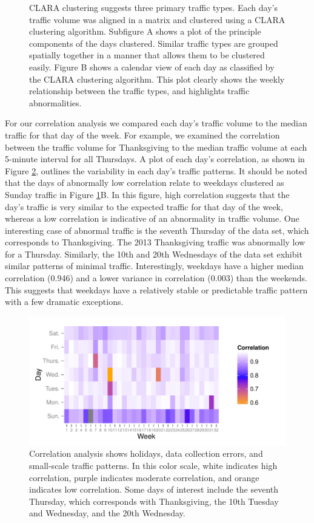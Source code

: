 \documentclass{report}
\begin{document}
\begin{figure}[H]
\begin{subfigure}[b]{0.45\textwidth}
\end{subfigure}
\caption{CLARA clustering suggests three primary traffic types. Each day's traffic volume
was aligned in a matrix and clustered using a CLARA clustering algorithm. Subfigure A shows a plot of the principle components of the days clustered. Similar traffic types are grouped spatially together in a manner that allows them to be clustered easily. Figure B shows a calendar view of each day as classified by the CLARA clustering algorithm. This plot clearly shows the weekly relationship between the traffic types, and highlights traffic abnormalities.}
\label{fig:clustering}
\end{figure}


For our correlation analysis we compared each day's traffic volume to the median
traffic for that day of the week. For example, we examined the correlation between
the traffic volume for Thanksgiving to the median traffic volume at each 5-minute
interval for all Thursdays. A plot of each day's correlation, as shown in Figure \ref{fig:correlation},
outlines the variability in each day's traffic patterns. It should be noted that
the days of abnormally low correlation relate to weekdays clustered as Sunday
traffic in Figure \ref{fig:clustering}B. In this figure, high correlation suggests that
the day's traffic is very similar to the expected traffic for that day of the week,
whereas a low correlation is indicative of an abnormality in traffic volume.
One interesting case of abnormal traffic is the seventh Thursday of the data set,
which corresponds to Thanksgiving. The 2013 Thanksgiving traffic was abnormally
low for a Thursday. Similarly, the 10th and 20th Wednesdays of the data set
exhibit similar patterns of minimal traffic. Interestingly, weekdays have a higher
median correlation (0.946) and a lower
variance in correlation (0.003) than the weekends. This
suggests that weekdays have a relatively stable or predictable traffic pattern
with a few dramatic exceptions.

\begin{figure}[h]
\centering
\includegraphics{upstat_report-008}
\caption{Correlation analysis shows holidays, data collection errors, and small-scale
traffic patterns. In this color scale, white indicates high correlation, purple
indicates moderate correlation, and orange indicates low correlation. Some days of
interest include the seventh Thursday, which corresponds with Thanksgiving, the
10th Tuesday and Wednesday, and the 20th Wednesday.}
\label{fig:correlation}
\end{figure}
\end{document}
